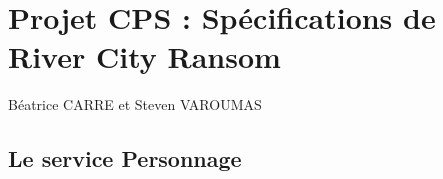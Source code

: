 \documentclass[a4paper, 11pt]{report}
\begin{document}
\chapter{Projet CPS : Spécifications de River City Ransom}

Béatrice CARRE et Steven VAROUMAS


\section{Le service Personnage}
\end{document}
